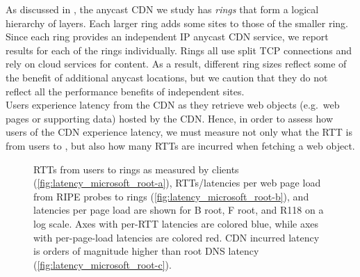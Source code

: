 \documentclass[sigconf,letterpaper,nonacm,10pt,anonymous]{acmart}
\begin{document}
As discussed in , the anycast CDN we study has
\emph{rings} that form a logical hierarchy of layers. Each larger ring
adds some sites to those of the smaller ring. Since each ring provides
an independent IP anycast CDN service, we report results for each of the
rings individually. Rings all use split TCP connections and rely on
cloud services for content. As a result, different ring sizes reflect
some of the benefit of additional anycast locations, but we caution that
they do not reflect all the performance benefits of independent sites.\\
Users experience latency from the CDN as they retrieve web objects
(e.g.~web pages or supporting data) hosted by the CDN. Hence, in order
to assess how users of the CDN experience latency, we must measure not
only what the RTT is from users to \feplural, but also how many RTTs are
incurred when fetching a web object.

\begin{figure}
  \centering
  
  \caption{RTTs from users to rings as measured by clients (\ref{fig:latency_microsoft_root-a}), RTTs/latencies per web page load from RIPE probes to rings (\ref{fig:latency_microsoft_root-b}), and latencies per page load are shown for B root, F root, and R118 on a log scale. Axes with per-RTT latencies are colored blue, while axes with per-page-load latencies are colored red. CDN incurred latency is orders of magnitude higher than root DNS latency (\ref{fig:latency_microsoft_root-c}).}


    \label{fig:latency_microsoft_root}
\end{figure}
\end{document}

